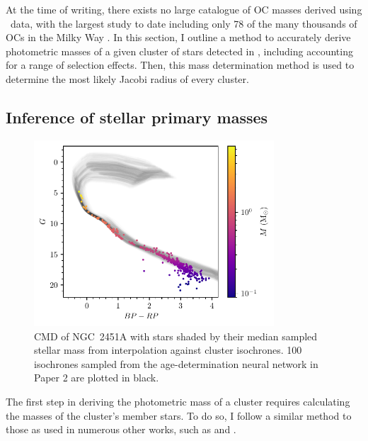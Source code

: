 At the time of writing, there exists no large catalogue of OC masses derived using \gaia\ data, with the largest study to date including only 78 of the many thousands of OCs in the Milky Way \citep{cordoni_photometric_binaries_2023}. In this section, I outline a method to accurately derive photometric masses of a given cluster of stars detected in \gaia, including accounting for a range of selection effects. Then, this mass determination method is used to determine the most likely Jacobi radius of every cluster.


\subsection{Inference of stellar primary masses}
\label{sec:dynamics:masses:isochrones}

\begin{figure}[t]
    \centering
    \includegraphics[width=0.8\textwidth]{fig/c4/masses_stellar.pdf}
    \caption[CMD of NGC~2451A with stars shaded by their median sampled stellar mass]{CMD of NGC~2451A with stars shaded by their median sampled stellar mass from interpolation against cluster isochrones. 100 isochrones sampled from the age-determination neural network in Paper 2 are plotted in black.}
    \label{fig:dynamics:masses:stellar_masses}
 \end{figure}

 The first step in deriving the photometric mass of a cluster requires calculating the masses of the cluster's member stars. To do so, I follow a similar method to those as used in numerous other works, such as \cite{meingast_extended_2021} and \cite{cordoni_photometric_binaries_2023}.

